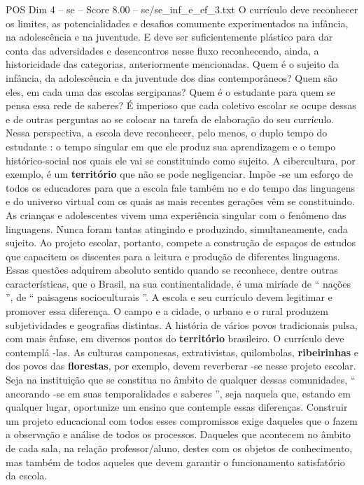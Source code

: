 \begin{textsample}{POS Dim 4 – se – Score 8.00 – se/se\_inf\_e\_ef\_3.txt}
O currículo deve reconhecer os limites, as potencialidades e desafios comumente experimentados na infância, na adolescência e na juventude.
E deve ser suficientemente plástico para dar conta das adversidades e desencontros nesse fluxo reconhecendo, ainda, a historicidade das categorias, anteriormente mencionadas.
Quem é o sujeito da infância, da adolescência e da juventude dos dias contemporâneos?
Quem são eles, em cada uma das escolas sergipanas?
Quem é o estudante para quem se pensa essa rede de saberes?
É imperioso que cada coletivo escolar se ocupe dessas e de outras perguntas ao se colocar na tarefa de elaboração do seu currículo.
Nessa perspectiva, a escola deve reconhecer, pelo menos, o duplo tempo do estudante : o tempo singular em que ele produz sua aprendizagem e o tempo histórico-social nos quais ele vai se constituindo como sujeito.
A cibercultura, por exemplo, é um \textbf{território} que não se pode negligenciar.
Impõe -se um esforço de todos os educadores para que a escola fale também no e do tempo das linguagens e do universo virtual com os quais as mais recentes gerações vêm se constituindo.
As crianças e adolescentes vivem uma experiência singular com o fenômeno das linguagens.
Nunca foram tantas atingindo e produzindo, simultaneamente, cada sujeito.
Ao projeto escolar, portanto, compete a construção de espaços de estudos que capacitem os discentes para a leitura e produção de diferentes linguagens.
Essas questões adquirem absoluto sentido quando se reconhece, dentre outras características, que o Brasil, na sua continentalidade, é uma miríade de “ nações ”, de “ paisagens socioculturais ”.
A escola e seu currículo devem legitimar e promover essa diferença.
O campo e a cidade, o urbano e o rural produzem subjetividades e geografias distintas.
A história de vários povos tradicionais pulsa, com mais ênfase, em diversos pontos do \textbf{território} brasileiro.
O currículo deve contemplá -las.
As culturas camponesas, extrativistas, quilombolas, \textbf{ribeirinhas} e dos povos das \textbf{florestas}, por exemplo, devem reverberar -se nesse projeto escolar.
Seja na instituição que se constitua no âmbito de qualquer dessas comunidades, “ ancorando -se em suas temporalidades e saberes ”, seja naquela que, estando em qualquer lugar, oportunize um ensino que contemple essas diferenças.
Construir um projeto educacional com todos esses compromissos exige daqueles que o fazem a observação e análise de todos os processos.
Daqueles que acontecem no âmbito de cada sala, na relação professor/aluno, destes com os objetos de conhecimento, mas também de todos aqueles que devem garantir o funcionamento satisfatório da escola.

\end{textsample}
